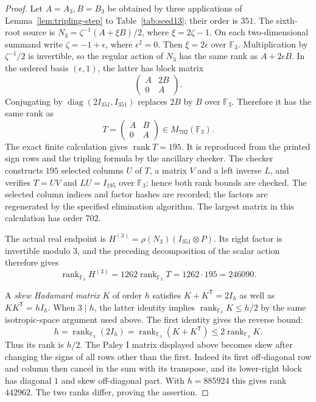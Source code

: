 \documentclass[10pt]{article}
\newcommand{\F}{\mathbb F}
\begin{document}
\begin{proof}
Let $A=A_3,B=B_3$ be obtained by three applications of
Lemma~\ref{lem:tripling-step} to Table~\ref{tab:seed13}; their order
is $351$. The sixth-root source is
$N_3=\zeta^{-1}(A+\xi B)/2$, where $\xi=2\zeta-1$.
On each two-dimensional summand write $\zeta=-1+\epsilon$, where
$\epsilon^2=0$. Then $\xi=2\epsilon$ over $\F_3$.
Multiplication by $\zeta^{-1}/2$ is invertible, so the regular action
of $N_3$ has the same rank as $A+2\epsilon B$. In the ordered basis
$(\epsilon,1)$, the latter has block matrix
\[
 \begin{pmatrix}A&2B\\0&A\end{pmatrix}.
\]
Conjugating by $\operatorname{diag}(2I_{351},I_{351})$ replaces
$2B$ by $B$ over $\F_3$. Therefore it has the same rank as
\begin{equation}\label{eq:source351-mod3}
 T=\begin{pmatrix}A&B\\0&A\end{pmatrix}\in M_{702}(\F_3).
\end{equation}
The exact finite calculation gives $\operatorname{rank}T=195$.
It is reproduced from the printed sign rows and the tripling formula
by the ancillary checker. The checker constructs $195$ selected
columns $U$ of $T$, a matrix $V$ and a left inverse $L$, and verifies
$T=UV$ and $LU=I_{195}$ over $\F_3$; hence both rank bounds are
checked. The selected column indices and factor hashes are recorded;
the factors are regenerated by the specified elimination algorithm.
The largest matrix
in this calculation has order $702$.

The actual real endpoint is
$H^{(3)}=\rho(N_3)(I_{351}\otimes P)$. Its right factor is invertible
modulo $3$, and the preceding decomposition of the scalar action
therefore gives
\[
 \operatorname{rank}_{\F_3}H^{(3)}=1262\operatorname{rank}_{\F_3}T
 =1262\cdot195=246090.
\]

A \emph{skew Hadamard matrix} $K$ of order $h$ satisfies
$K+K^{\mathsf T}=2I_h$ as well as $KK^{\mathsf T}=hI_h$.
When $3\mid h$, the latter identity implies
$\operatorname{rank}_{\F_3}K\leq h/2$ by the same isotropic-space
argument used above. The first identity gives the reverse bound:
\[
 h=\operatorname{rank}_{\F_3}(2I_h)
 =\operatorname{rank}_{\F_3}(K+K^{\mathsf T})
 \leq2\operatorname{rank}_{\F_3}K.
\]
Thus its rank is $h/2$. The Paley I matrix displayed above becomes
skew after changing the signs of all rows other than the first.
Indeed its first off-diagonal row and column then cancel in the sum
with its transpose, and its lower-right block has diagonal $1$ and
skew off-diagonal part. With $h=885924$ this gives rank $442962$.
The two ranks differ, proving the assertion.
\end{proof}
\end{document}
